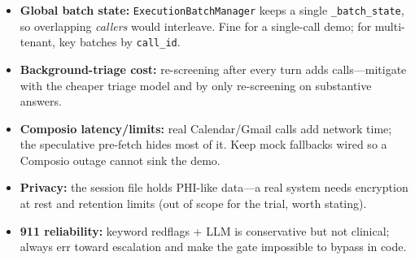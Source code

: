 \documentclass[11pt,a4paper]{article}
\begin{document}
\begin{itemize}[leftmargin=*]
  \item \textbf{Global batch state:} \texttt{ExecutionBatchManager} keeps a single \texttt{\_batch\_state}, so
  overlapping \emph{callers} would interleave. Fine for a single-call demo; for multi-tenant, key batches by
  \texttt{call\_id}.
  \item \textbf{Background-triage cost:} re-screening after every turn adds calls---mitigate with the cheaper
  triage model and by only re-screening on substantive answers.
  \item \textbf{Composio latency/limits:} real Calendar/Gmail calls add network time; the speculative pre-fetch
  hides most of it. Keep mock fallbacks wired so a Composio outage cannot sink the demo.
  \item \textbf{Privacy:} the session file holds PHI-like data---a real system needs encryption at rest and
  retention limits (out of scope for the trial, worth stating).
  \item \textbf{911 reliability:} keyword redflags + LLM is conservative but not clinical; always err toward
  escalation and make the gate impossible to bypass in code.
\end{itemize}
\end{document}
